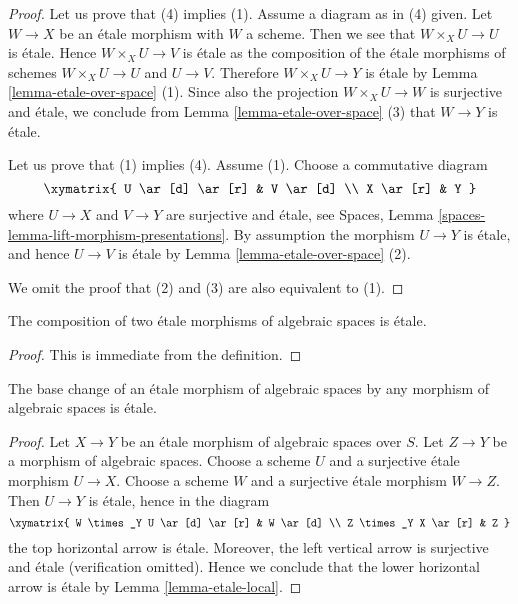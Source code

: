 \begin{proof}
Let us prove that (4) implies (1). Assume a diagram as in (4) given.
Let $W \to X$ be an \'etale morphism with $W$ a scheme. Then we see
that $W \times_X U \to U$ is \'etale. Hence $W \times_X U \to V$ is \'etale
as the composition of the \'etale morphisms of schemes $W \times_X U \to U$
and $U \to V$. Therefore $W \times_X U \to Y$ is \'etale by
Lemma \ref{lemma-etale-over-space} (1). Since also
the projection $W \times_X U \to W$ is surjective and \'etale, we conclude
from Lemma \ref{lemma-etale-over-space} (3) that $W \to Y$ is \'etale.

\medskip\noindent
Let us prove that (1) implies (4). Assume (1). Choose a commutative diagram
$$
\xymatrix{
U \ar[d] \ar[r] & V \ar[d] \\
X \ar[r] & Y
}
$$
where $U \to X$ and $V \to Y$ are surjective and \'etale, see
Spaces, Lemma \ref{spaces-lemma-lift-morphism-presentations}.
By assumption the morphism $U \to Y$ is \'etale,
and hence $U \to V$ is \'etale by Lemma \ref{lemma-etale-over-space} (2).

\medskip\noindent
We omit the proof that (2) and (3) are also equivalent to (1).
\end{proof}

\begin{lemma}
\label{lemma-composition-etale}
The composition of two \'etale morphisms of algebraic spaces
is \'etale.
\end{lemma}

\begin{proof}
This is immediate from the definition.
\end{proof}

\begin{lemma}
\label{lemma-base-change-etale}
The base change of an \'etale morphism of algebraic spaces
by any morphism of algebraic spaces is \'etale.
\end{lemma}

\begin{proof}
Let $X \to Y$ be an \'etale morphism of algebraic spaces over $S$.
Let $Z \to Y$ be a morphism of algebraic spaces.
Choose a scheme $U$ and a surjective \'etale morphism $U \to X$.
Choose a scheme $W$ and a surjective \'etale morphism $W \to Z$.
Then $U \to Y$ is \'etale, hence in the diagram
$$
\xymatrix{
W \times_Y U \ar[d] \ar[r] & W \ar[d] \\
Z \times_Y X \ar[r] & Z
}
$$
the top horizontal arrow is \'etale.
Moreover, the left vertical arrow is surjective
and \'etale (verification omitted). Hence we conclude that the lower
horizontal arrow is \'etale by Lemma \ref{lemma-etale-local}.
\end{proof}

